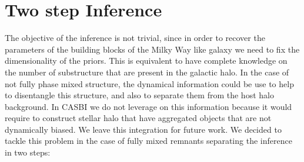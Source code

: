 \section{Two step Inference}\label{sec:Two step Inference}
The objective of the inference is not trivial, since in order to recover the parameters of the building blocks of the Milky Way like galaxy we need to fix the dimensionality of the priors. This is equivalent to have complete knowledge on the number of substructure that are present in the galactic halo. In the case of not fully phase mixed structure, the dynamical information could be use to help to disentangle this structure, and also to separate them from the host halo background. In CASBI we do not leverage on this information because it would require to construct stellar halo that have aggregated objects that are not dynamically biased. We leave this integration for future work. We decided to tackle this problem in the case of fully mixed remnants separating the inference in two steps:
